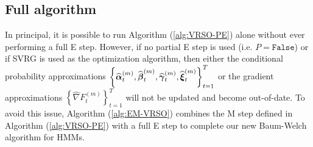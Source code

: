 


\subsection{Full algorithm}

In principal, it is possible to run Algorithm (\ref{alg:VRSO-PE}) alone without ever performing a full E step. However, if no partial E step is used (i.e. $P = \texttt{False}$) or if SVRG is used as the optimization algorithm, then either the conditional probability approximations $\left\{\widehat {\boldsymbol{\alpha}}_t^{(m)}, \widehat {\boldsymbol{\beta}}_t^{(m)}, \widehat {\boldsymbol{\gamma}}_t^{(m)}, \widehat {\boldsymbol{\xi}}_t^{(m)} \right\}_{t=1}^T$ or the gradient approximations $\left\{\widehat \nabla F_{t}^{(m)} \right\}_{t=1}^T$ will not be updated and become out-of-date. To avoid this issue, Algorithm (\ref{alg:EM-VRSO}) combines the M step defined in Algorithm (\ref{alg:VRSO-PE}) with a full E step to complete our new Baum-Welch algorithm for HMMs.

